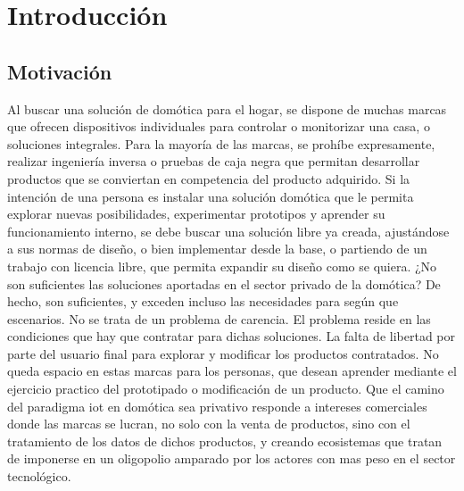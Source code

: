 \cleardoublepage

\chapter{Introducción}

\section{Motivación}
\label{ch:Capitulo1}

Al buscar una solución de domótica para el hogar, se dispone de muchas marcas que ofrecen dispositivos individuales para controlar o monitorizar una casa, o soluciones integrales. Para la mayoría de las marcas, se prohíbe expresamente, realizar ingeniería inversa o pruebas de caja negra que permitan desarrollar productos que se conviertan en competencia del producto adquirido. Si la intención de una persona es instalar una solución domótica que le permita explorar nuevas posibilidades, experimentar prototipos y aprender su funcionamiento interno, se debe buscar una solución libre ya creada, ajustándose a sus normas de diseño, o bien implementar desde la base, o partiendo de un trabajo con licencia libre, que permita expandir su diseño como se quiera. ¿No son suficientes las soluciones aportadas en el sector privado de la domótica? De hecho, son suficientes, y exceden incluso las necesidades para según que escenarios. No se trata de un problema de carencia. El problema reside en las condiciones que hay que contratar para dichas soluciones. La falta de libertad por parte del usuario final para explorar y modificar los productos contratados. No queda espacio en estas marcas para los personas, que desean aprender mediante el ejercicio practico del prototipado o modificación de un producto. Que el camino del paradigma \gls{iot} en domótica sea privativo responde a intereses comerciales donde las marcas se lucran, no solo con la venta de productos, sino con el tratamiento de los datos de dichos productos, y creando ecosistemas que tratan de imponerse en un oligopolio amparado por los actores con mas peso en el sector tecnológico.

\vspace{1cm}

